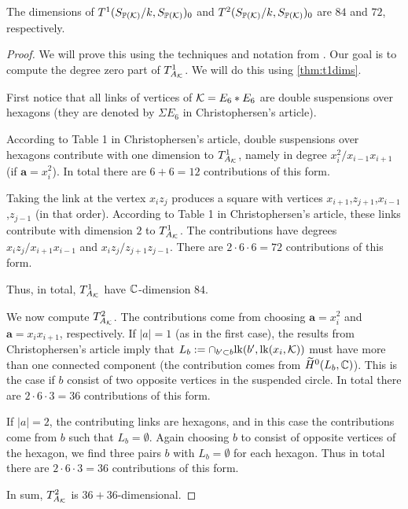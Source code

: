 \begin{proposition}
The dimensions of $T^1(S_{\mathbb{P}(\mathcal{K})}/k,S_{\mathbb{P}(\mathcal{K})})_0$ and $T^2(S_{\mathbb{P}(\mathcal{K})}/k,S_{\mathbb{P}(\mathcal{K})})_0$ are $84$ and $72$, respectively.
\end{proposition}
\begin{proof}
We will prove this using the techniques and notation from \cite{deforming_christophersen}. Our goal is to compute the degree zero part of $T^1_{A_{\mathcal{K}}}$. We will do this using \cref{thm:t1dims}.

First notice that all links of vertices of $\mathcal{K}=E_6 \ast E_6$ are double suspensions over hexagons (they are denoted by $\Sigma E_6$ in Christophersen's article). 

According to Table 1 in Christophersen's article, double suspensions over hexagons contribute with one dimension to $T^1_{A_{\mathcal{K}}}$, namely in degree $x_i^2/x_{i-1}x_{i+1}$ (if $\mathbf a =x_i^2$). In total there are $6+6=12$ contributions of this form.

Taking the link at the vertex $x_iz_j$ produces a square with vertices $x_{i+1}$,$z_{j+1}$,$x_{i-1}$,$z_{j-1}$ (in that order). According to Table 1 in Christophersen's article, these links contribute with dimension $2$ to $T^1_{A_{\mathcal{K}}}$. The contributions have degrees $x_iz_j/x_{i+1}x_{i-1}$ and $x_iz_j/z_{j+1}z_{j-1}$. There are $2 \cdot 6 \cdot 6=72$ contributions of this form.

Thus, in total, $T^1_{A_{\mathcal{K}}}$ have $\mathbb{C}$-dimension $84$.

We now compute $T^2_{A_{\mathcal{K}}}$. The contributions come from choosing $\mathbf a=x_i^2$ and $\mathbf a=x_ix_{i+1}$, respectively. If $|a|=1$ (as in the first case), the results from Christophersen's article imply that $L_b := \cap_{b' \subset b} \mathrm{lk}(b',\mathrm{lk}(x_i,\mathcal{K}))$ must have more than one connected component (the contribution comes from $\widetilde H^0(L_b,\mathbb{C})$). This is the case if $b$ consist of two opposite vertices in the suspended circle. In total there are $2 \cdot 6 \cdot 3=36$ contributions of this form. 

If $|a|=2$, the contributing links are hexagons, and in this case the contributions come from $b$ such that $L_b=\emptyset$. Again choosing $b$ to consist of opposite vertices of the hexagon, we find three pairs $b$ with $L_b=\emptyset$ for each hexagon. Thus in total there are $2 \cdot 6 \cdot 3=36$ contributions of this form.

In sum, $T^2_{A_{\mathcal{K}}}$ is $36+36$-dimensional.
\end{proof}

